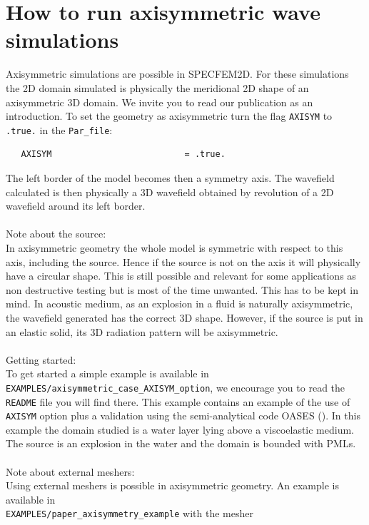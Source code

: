 \section{How to run axisymmetric wave simulations}
\label{sec:axisym}
Axisymmetric simulations are possible in SPECFEM2D. For these simulations the 2D domain simulated is physically the meridional 2D shape of an axisymmetric 3D domain.
We invite you to read our publication \citep{BoCrKoAs16} as an introduction.
To set the geometry as axisymmetric turn the flag \texttt{AXISYM} to \texttt{.true.} in the \texttt{Par\_file}:
\begin{verbatim}
   AXISYM                          = .true.
\end{verbatim}
The left border of the model becomes then a symmetry axis. The wavefield calculated is then physically a 3D wavefield obtained by revolution of a 2D wavefield
around its left border.
\\\\
Note about the source:\\
In axisymmetric geometry the whole model is symmetric with respect to this axis, including the source. Hence if the source is not on the axis it will physically
have a circular shape. This is still possible and relevant for some applications as non destructive testing but
is most of the time unwanted. This has to be kept in mind. In acoustic medium, as an explosion in a fluid is naturally axisymmetric, the wavefield generated has the
correct 3D shape. However, if the source is put in an elastic solid, its 3D radiation pattern will be axisymmetric.
\\\\
Getting started:\\
To get started a simple example is available in
\texttt{EXAMPLES/axisymmetric\_case\_AXISYM\_option}, we encourage you to read the \texttt{README} file you will find there.
This example contains an example of the use of \texttt{AXISYM} option plus a validation using the semi-analytical code OASES (\cite{Oases2004}).
In this example the domain studied is a water layer lying above a viscoelastic medium. The source is an explosion in the water and the domain is bounded with PMLs.
\\\\
Note about external meshers:\\
Using external meshers is possible in axisymmetric geometry. An example is available in \\ \texttt{EXAMPLES/paper\_axisymmetry\_example} with the mesher
